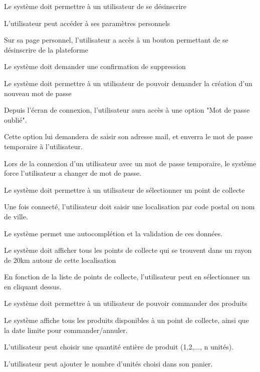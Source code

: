 \begin{reqf}{Le système doit permettre à un utilisateur de se désinscrire}
\item L'utilisateur peut accéder à ses paramètres personnels
\item Sur sa page personnel, l'utilisateur a accès à un bouton permettant de se désinscrire de la plateforme
\item Le système doit demander une confirmation de suppression
\end{reqf}

\begin{reqf}{Le système doit permettre à un utilisateur de pouvoir demander la création d'un nouveau mot de passe}
\item Depuis l'écran de connexion, l'utilisateur aura accès à une option "Mot de passe oublié".
\item Cette option lui demandera de saisir son adresse mail, et enverra le mot de passe temporaire à l'utilisateur.
\item Lors de la connexion d'un utilisateur avec un mot de passe temporaire, le système force l'utilisateur a changer de mot de passe.
\end{reqf}

\begin{reqf}{Le système doit permettre à un utilisateur de sélectionner un point de collecte}
\item Une fois connecté, l'utilisateur doit saisir une localisation par code postal ou nom de ville.
\item Le système permet une autocomplétion et la validation de ces données.
\item Le système doit afficher tous les points de collecte qui se trouvent dans un rayon de 20km autour de cette localisation
\item En fonction de la liste de points de collecte, l'utilisateur peut en sélectionner un en cliquant dessus.
\end{reqf}

\begin{reqf}{Le système doit permettre à un utilisateur de pouvoir commander des produits}
\item Le système affiche tous les produits disponibles à un point de collecte, ainsi que la date limite pour commander/annuler.
\item L'utilisateur peut choisir une quantité entière de produit (1,2,..., n unités).
\item L'utilisateur peut ajouter le nombre d'unités choisi dans son panier.
\end{reqf}

